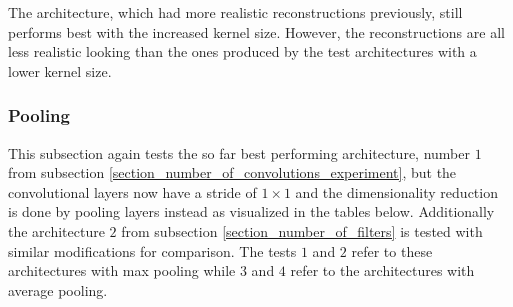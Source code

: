 The architecture, which had more realistic reconstructions previously, still performs best with the increased
kernel size. However, the reconstructions are all less realistic looking than the ones produced by the 
test architectures with a lower kernel size.

\subsubsection{Pooling}

This subsection again tests the so far best performing architecture, number $1$ from subsection 
\ref{section_number_of_convolutions_experiment}, but the convolutional layers now have a stride of $1\times1$
and the dimensionality reduction is done by pooling layers instead as visualized in the tables below. 
Additionally the architecture $2$ from subsection \ref{section_number_of_filters} is tested 
with similar modifications for comparison. The tests $1$ and $2$ refer to these architectures with max pooling
while $3$ and $4$ refer to the architectures with average pooling.

